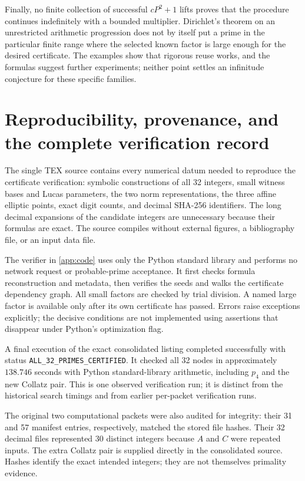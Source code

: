 \documentclass[11pt,a4paper]{article}
\theoremstyle{definition}\newtheorem{definition}[theorem]{Definition}
\theoremstyle{remark}\newtheorem{remark}[theorem]{Remark}
\begin{document}
Finally, no finite collection of successful $cP^2+1$ lifts proves that the
procedure continues indefinitely with a bounded multiplier. Dirichlet's
theorem on an unrestricted arithmetic progression does not by itself put a
prime in the particular finite range where the selected known factor is
large enough for the desired certificate. The examples show that rigorous
reuse works, and the formulas suggest further experiments; neither point
settles an infinitude conjecture for these specific families.

\section{Reproducibility, provenance, and the complete verification record}
\label{sec:reproduce}

The single TEX source contains every numerical datum needed to reproduce
the certificate verification: symbolic constructions of all 32 integers,
small witness bases and Lucas parameters, the two norm representations,
the three affine elliptic points, exact digit counts, and decimal SHA-256
identifiers. The long decimal expansions of the candidate integers are
unnecessary because their formulas are exact. The source compiles without
external figures, a bibliography file, or an input data file.

The verifier in \cref{app:code} uses only the Python standard library and
performs no network request or probable-prime acceptance. It first checks
formula reconstruction and metadata, then verifies the seeds and walks
the certificate dependency graph. All small factors are checked by trial
division. A named large factor is available only after its own certificate
has passed. Errors raise exceptions explicitly; the decisive conditions
are not implemented using assertions that disappear under Python's
optimization flag.

A final execution of the exact consolidated listing completed successfully
with status \texttt{ALL\_32\_PRIMES\_CERTIFIED}. It checked all 32 nodes in
approximately $138.746$ seconds with Python standard-library arithmetic,
including $p_4$ and the new Collatz pair. This is one observed verification
run; it is distinct from the historical search timings and from earlier
per-packet verification runs.

The original two computational packets were also audited for integrity:
their 31 and 57 manifest entries, respectively, matched the stored file
hashes. Their 32 decimal files represented 30 distinct integers because
$A$ and $C$ were repeated inputs. The extra Collatz pair is supplied directly
in the consolidated source. Hashes identify the exact intended integers;
they are not themselves primality evidence.
\end{document}

